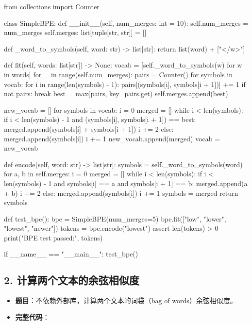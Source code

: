 \begin{codeblock}
from collections import Counter


class SimpleBPE:
    def __init__(self, num_merges: int = 10):
        self.num_merges = num_merges
        self.merges: list[tuple[str, str]] = []

    def _word_to_symbols(self, word: str) -> list[str]:
        return list(word) + ["</w>"]

    def fit(self, words: list[str]) -> None:
        vocab = [self._word_to_symbols(w) for w in words]
        for _ in range(self.num_merges):
            pairs = Counter()
            for symbols in vocab:
                for i in range(len(symbols) - 1):
                    pairs[(symbols[i], symbols[i + 1])] += 1
            if not pairs:
                break
            best = max(pairs, key=pairs.get)
            self.merges.append(best)

            new_vocab = []
            for symbols in vocab:
                i = 0
                merged = []
                while i < len(symbols):
                    if i < len(symbols) - 1 and (symbols[i], symbols[i + 1]) == best:
                        merged.append(symbols[i] + symbols[i + 1])
                        i += 2
                    else:
                        merged.append(symbols[i])
                        i += 1
                new_vocab.append(merged)
            vocab = new_vocab

    def encode(self, word: str) -> list[str]:
        symbols = self._word_to_symbols(word)
        for a, b in self.merges:
            i = 0
            merged = []
            while i < len(symbols):
                if i < len(symbols) - 1 and symbols[i] == a and symbols[i + 1] == b:
                    merged.append(a + b)
                    i += 2
                else:
                    merged.append(symbols[i])
                    i += 1
            symbols = merged
        return symbols


def test_bpe():
    bpe = SimpleBPE(num_merges=5)
    bpe.fit(["low", "lower", "lowest", "newer"])
    tokens = bpe.encode("lowest")
    assert len(tokens) > 0
    print("BPE test passed:", tokens)


if __name__ == "__main__":
    test_bpe()
\end{codeblock}

\subsection{2. 计算两个文本的余弦相似度}
\begin{itemize}[leftmargin=2em]
\item \textbf{题目}：不依赖外部库，计算两个文本的词袋（bag of words）余弦相似度。
\item \textbf{完整代码}：
\end{itemize}

